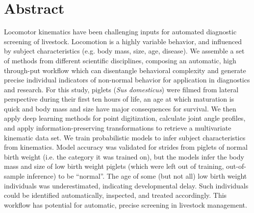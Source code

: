 \clearpage
\section{Abstract}
\label{abstract}
Locomotor kinematics have been challenging inputs for automated diagnostic screening of livestock.
Locomotion is a highly variable behavior, and influenced by subject characteristics (e.g. body mass, size, age, disease).
We assemble a set of methods from different scientific disciplines, composing an automatic, high through-put workflow which can disentangle behavioral complexity and generate precise individual indicators of non-normal behavior for application in diagnostics and research.
For this study, piglets (\emph{Sus domesticus}) were filmed from lateral perspective during their first ten hours of life, an age at which maturation is quick and body mass and size have major consequences for survival.
We then apply deep learning methods for point digitization, calculate joint angle profiles, and apply information-preserving transformations to retrieve a multivariate kinematic data set.
We train probabilistic models to infer subject characteristics from kinematics.
Model accuracy was validated for strides from piglets of normal birth weight (i.e. the category it was trained on), but the models infer the body mass and size of low birth weight piglets (which were left out of training, out-of-sample inference) to be ``normal''.
The age of some (but not all) low birth weight individuals was underestimated, indicating developmental delay.
Such individuals could be identified automatically, inspected, and treated accordingly.
This workflow has potential for automatic, precise screening in livestock management.


\FloatBarrier
\clearpage
